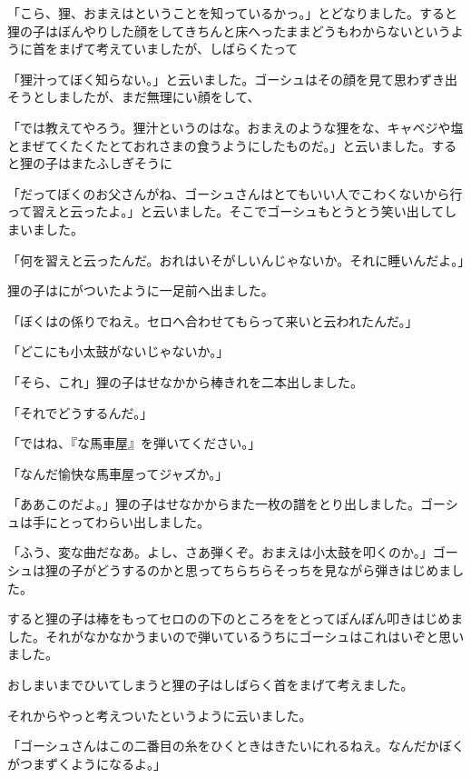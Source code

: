 \documentclass[uplatex,a5paper,twoside]{jsarticle}
\begin{document}
「こら、狸、おまえはということを知っているかっ。」とどなりました。すると狸の子はぼんやりした顔をしてきちんと床へったままどうもわからないというように首をまげて考えていましたが、しばらくたって

「狸汁ってぼく知らない。」と云いました。ゴーシュはその顔を見て思わずき出そうとしましたが、まだ無理にい顔をして、

「では教えてやろう。狸汁というのはな。おまえのような狸をな、キャベジや塩とまぜてくたくたとておれさまの食うようにしたものだ。」と云いました。すると狸の子はまたふしぎそうに

「だってぼくのお父さんがね、ゴーシュさんはとてもいい人でこわくないから行って習えと云ったよ。」と云いました。そこでゴーシュもとうとう笑い出してしまいました。

「何を習えと云ったんだ。おれはいそがしいんじゃないか。それに睡いんだよ。」

狸の子はにがついたように一足前へ出ました。

「ぼくはの係りでねえ。セロへ合わせてもらって来いと云われたんだ。」

「どこにも小太鼓がないじゃないか。」

「そら、これ」狸の子はせなかから棒きれを二本出しました。

「それでどうするんだ。」

「ではね、『な馬車屋』を弾いてください。」

「なんだ愉快な馬車屋ってジャズか。」

「ああこのだよ。」狸の子はせなかからまた一枚の譜をとり出しました。ゴーシュは手にとってわらい出しました。

「ふう、変な曲だなあ。よし、さあ弾くぞ。おまえは小太鼓を叩くのか。」ゴーシュは狸の子がどうするのかと思ってちらちらそっちを見ながら弾きはじめました。

すると狸の子は棒をもってセロのの下のところををとってぽんぽん叩きはじめました。それがなかなかうまいので弾いているうちにゴーシュはこれはいぞと思いました。

おしまいまでひいてしまうと狸の子はしばらく首をまげて考えました。

それからやっと考えついたというように云いました。

「ゴーシュさんはこの二番目の糸をひくときはきたいにれるねえ。なんだかぼくがつまずくようになるよ。」
\end{document}
